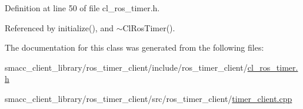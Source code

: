 Definition at line 50 of file cl\+\_\+ros\+\_\+timer.\+h.



Referenced by initialize(), and $\sim$\+Cl\+Ros\+Timer().



The documentation for this class was generated from the following files\+:\begin{DoxyCompactItemize}
\item 
smacc\+\_\+client\+\_\+library/ros\+\_\+timer\+\_\+client/include/ros\+\_\+timer\+\_\+client/\hyperlink{cl__ros__timer_8h}{cl\+\_\+ros\+\_\+timer.\+h}\item 
smacc\+\_\+client\+\_\+library/ros\+\_\+timer\+\_\+client/src/ros\+\_\+timer\+\_\+client/\hyperlink{timer__client_8cpp}{timer\+\_\+client.\+cpp}\end{DoxyCompactItemize}

